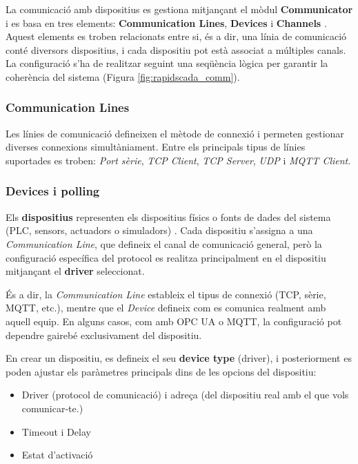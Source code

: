 \documentclass[a4paper,11pt,DIV=13,headings=normal,abstract=true,twoside=semi]{article}
\begin{document}
La comunicació amb dispositius es gestiona mitjançant el mòdul \textbf{Communicator} i es basa en tres elements: \textbf{Communication Lines}, \textbf{Devices} i \textbf{Channels} \cite{rapidscada_device_polling, rapidscada_channels}. Aquest elements es troben relacionats entre si, és a dir, una línia de comunicació conté diversors dispositius, i cada dispositiu pot està associat a múltiples canals. La configuració s'ha de realitzar seguint una seqüència lògica per garantir la coherència del sistema (Figura \ref{fig:rapidscada_comm}).


\subsubsection*{Communication Lines}

Les línies de comunicació defineixen el mètode de connexió i permeten gestionar diverses connexions simultàniament.
Entre els principals tipus de línies suportades es troben: \textit{Port sèrie}, \textit{TCP Client}, \textit{TCP Server}, \textit{UDP} i \textit{MQTT Client}.


\subsubsection*{Devices i polling}


Els \textbf{dispositius} representen els dispositius físics o fonts de dades del sistema (PLC, sensors, actuadors o simuladors) \cite{rapidscada_device_polling}. Cada dispositiu s'assigna a una \textit{Communication Line}, que defineix el canal de comunicació general, però la configuració específica del protocol es realitza principalment en el dispositiu mitjançant el \textbf{driver} seleccionat.

És a dir, la \textit{Communication Line} estableix el tipus de connexió (TCP, sèrie, MQTT, etc.), mentre que el \textit{Device} defineix com es comunica realment amb aquell equip. En alguns casos, com amb OPC UA o MQTT, la configuració pot dependre gairebé exclusivament del dispositiu.

En crear un dispositiu, es defineix el seu \textbf{device type} (driver), i posteriorment es poden ajustar els paràmetres principals dins de les opcions del dispositiu:


\begin{itemize}
    \item Driver (protocol de comunicació) i adreça (del dispositiu real amb el que vols comunicar-te.)
    \item Timeout i Delay
    \item Estat d'activació
\end{itemize}
\end{document}
